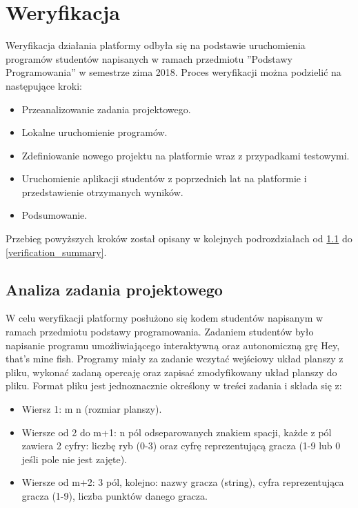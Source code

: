 \chapter{Weryfikacja}
\label{chapter:verify}

Weryfikacja działania platformy odbyła się na podstawie uruchomienia programów studentów napisanych w ramach przedmiotu ”Podstawy Programowania” w semestrze zima 2018.
Proces weryfikacji można podzielić na następujące kroki:
\begin{itemize}
    \item Przeanalizowanie zadania projektowego.
    \item Lokalne uruchomienie programów.
    \item Zdefiniowanie nowego projektu na platformie wraz z przypadkami testowymi.
    \item Uruchomienie aplikacji studentów z poprzednich lat na platformie i przedstawienie otrzymanych wyników.
    \item Podsumowanie.
\end{itemize}

Przebieg powyższych kroków został opisany w kolejnych podrozdziałach od \ref{analysis_students_projects} do \ref{verification_summary}.


\section{Analiza zadania projektowego}
\label{analysis_students_projects}

W celu weryfikacji platformy posłużono się kodem studentów napisanym w ramach przedmiotu podstawy programowania.
Zadaniem studentów było napisanie programu umożliwiającego interaktywną oraz autonomiczną grę Hey, that’s mine fish.
Programy miały za zadanie wczytać wejściowy układ planszy z pliku, wykonać zadaną opercaję oraz zapisać zmodyfikowany układ planszy do pliku.
Format pliku jest jednoznacznie określony w treści zadania i składa się z:
\begin{itemize}
    \item Wiersz 1: m n (rozmiar planszy).
    \item Wiersze od 2 do m+1: n pól odseparowanych znakiem spacji, każde z pól zawiera 2 cyfry: liczbę ryb (0-3) oraz cyfrę reprezentującą gracza (1-9 lub 0 jeśli pole nie jest zajęte).
    \item Wiersze od m+2: 3 pól, kolejno: nazwy gracza (string), cyfra reprezentująca gracza (1-9), liczba punktów danego gracza.
\end{itemize}

